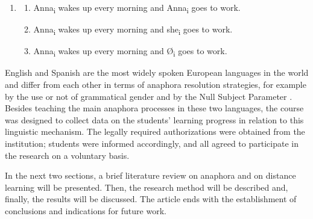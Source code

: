 \documentclass{textolivre}
\begin{document}
%
%
\begin{enumerate}[wide,label=(\arabic*),topsep=1ex,partopsep=1ex,leftmargin=0.15cm,noitemsep]
\setlength{\itemindent}{0em}
\item[]{} \addtocounter{enumi}{1} %
\begin{enumerate}[wide,label=(\arabic{enumi}\alph*),topsep=1ex,partopsep=1ex,noitemsep]
\setlength{\itemindent}{0em}
\item \label{itm-1a} Anna\textsubscript{i} wakes up every morning and Anna\textsubscript{i} goes to work.
\item \label{itm-1b} Anna\textsubscript{i} wakes up every morning and she\textsubscript{i} goes to work.
\item \label{itm-1c} Anna\textsubscript{i} wakes up every morning and Ø\textsubscript{i} goes to work.
\end{enumerate}
\end{enumerate}


English and Spanish are the most widely spoken European languages in the world
\cite{eberhard_ethnologue:_2020} and differ from each other in terms of
anaphora resolution strategies, for example by the use or not of grammatical
gender and by the Null Subject Parameter \cite{chomsky_lectures_1981,rizzi_issues_1982}. Besides
teaching the main anaphora processes in these two languages, the course was
designed to collect data on the students' learning progress in relation to this
linguistic mechanism. The legally required authorizations were obtained from
the institution; students were informed accordingly, and all agreed to
participate in the research on a voluntary basis.

In the next two sections, a brief literature review on anaphora and on distance
learning will be presented. Then, the research method will be described and,
finally, the results will be discussed. The article ends with the establishment
of conclusions and indications for future work.
\end{document}

